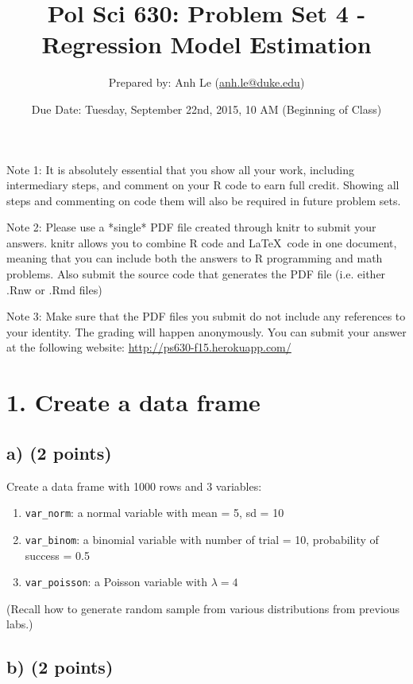 \documentclass{article}\usepackage[]{graphicx}\usepackage[]{color}
\begin{document}
\title{Pol Sci 630: Problem Set 4 - Regression Model Estimation}

\author{Prepared by: Anh Le (\href{mailto:anh.le@duke.edu}{anh.le@duke.edu})}

\date{Due Date: Tuesday, September 22nd, 2015, 10 AM (Beginning of Class)}

\maketitle

Note 1: It is absolutely essential that you show all your work, including intermediary steps, and comment on your R code to earn full credit. Showing all steps and commenting on code them will also be required in future problem sets.

Note 2: Please use a *single* PDF file created through knitr to submit your answers. knitr allows you to combine R code and \LaTeX \ code in one document, meaning that you can include both the answers to R programming and math problems. Also submit the source code that generates the PDF file (i.e. either .Rnw or .Rmd files)

Note 3: Make sure that the PDF files you submit do not include any references to your identity. The grading will happen anonymously. You can submit your answer at the following website: \url{http://ps630-f15.herokuapp.com/}

\section*{1. Create a data frame}

\subsection*{a) (2 points)}
Create a data frame with 1000 rows and 3 variables:
\begin{enumerate}
\item \verb`var_norm`: a normal variable with mean = 5, sd = 10
\item \verb`var_binom`: a binomial variable with number of trial = 10, probability of success = 0.5
\item \verb`var_poisson`: a Poisson variable with $\lambda = 4$
\end{enumerate}

(Recall how to generate random sample from various distributions from previous labs.)

\subsection*{b) (2 points)}
\end{document}
